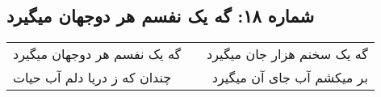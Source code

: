 \begin{center}
\section*{شماره ۱۸: گه یک نفسم هر دوجهان میگیرد}
\label{sec:018}
\begin{longtable}{l p{0.5cm} r}
گه یک نفسم هر دوجهان میگیرد
&&
گه یک سخنم هزار جان میگیرد
\\
چندان که ز دریا دلم آب حیات
&&
بر میکشم آب جای آن میگیرد
\\
\end{longtable}
\end{center}
